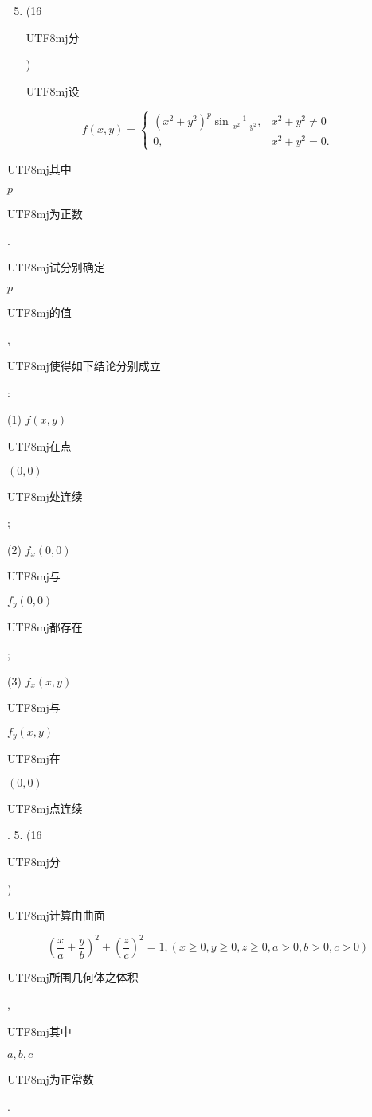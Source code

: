 \documentclass[10pt]{article}
\begin{document}
\begin{enumerate}
  \setcounter{enumi}{4}
  \item (16 \begin{CJK}{UTF8}{mj}分\end{CJK}) \begin{CJK}{UTF8}{mj}设\end{CJK}
\end{enumerate}
$$
f(x, y)= \begin{cases}\left(x^{2}+y^{2}\right)^{p} \sin \frac{1}{x^{2}+y^{2}}, & x^{2}+y^{2} \neq 0 \\ 0, & x^{2}+y^{2}=0 .\end{cases}
$$
\begin{CJK}{UTF8}{mj}其中\end{CJK} $p$ \begin{CJK}{UTF8}{mj}为正数\end{CJK}. \begin{CJK}{UTF8}{mj}试分别确定\end{CJK} $p$ \begin{CJK}{UTF8}{mj}的值\end{CJK}, \begin{CJK}{UTF8}{mj}使得如下结论分别成立\end{CJK}:

(1) $f(x, y)$ \begin{CJK}{UTF8}{mj}在点\end{CJK} $(0,0)$ \begin{CJK}{UTF8}{mj}处连续\end{CJK};

(2) $f_{x}(0,0)$ \begin{CJK}{UTF8}{mj}与\end{CJK} $f_{y}(0,0)$ \begin{CJK}{UTF8}{mj}都存在\end{CJK};

(3) $f_{x}(x, y)$ \begin{CJK}{UTF8}{mj}与\end{CJK} $f_{y}(x, y)$ \begin{CJK}{UTF8}{mj}在\end{CJK} $(0,0)$ \begin{CJK}{UTF8}{mj}点连续\end{CJK}. 5. (16 \begin{CJK}{UTF8}{mj}分\end{CJK}) \begin{CJK}{UTF8}{mj}计算由曲面\end{CJK}
$$
\left(\frac{x}{a}+\frac{y}{b}\right)^{2}+\left(\frac{z}{c}\right)^{2}=1,(x \geq 0, y \geq 0, z \geq 0, a>0, b>0, c>0)
$$
\begin{CJK}{UTF8}{mj}所围几何体之体积\end{CJK}, \begin{CJK}{UTF8}{mj}其中\end{CJK} $a, b, c$ \begin{CJK}{UTF8}{mj}为正常数\end{CJK}.
\end{document}
